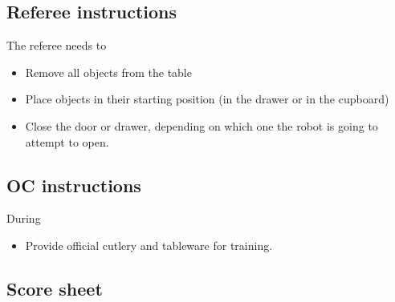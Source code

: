\subsection*{Referee instructions}

The referee needs to
\begin{itemize}
	\item Remove all objects from the table
	\item Place objects in their starting position (in the drawer or in the cupboard)
	\item Close the door or drawer, depending on which one the robot is going to attempt to open.
\end{itemize}

\subsection*{OC instructions}
During \SetupDays
\begin{itemize}
	\item Provide official cutlery and tableware for training.
\end{itemize}

\subsection*{Score sheet}



